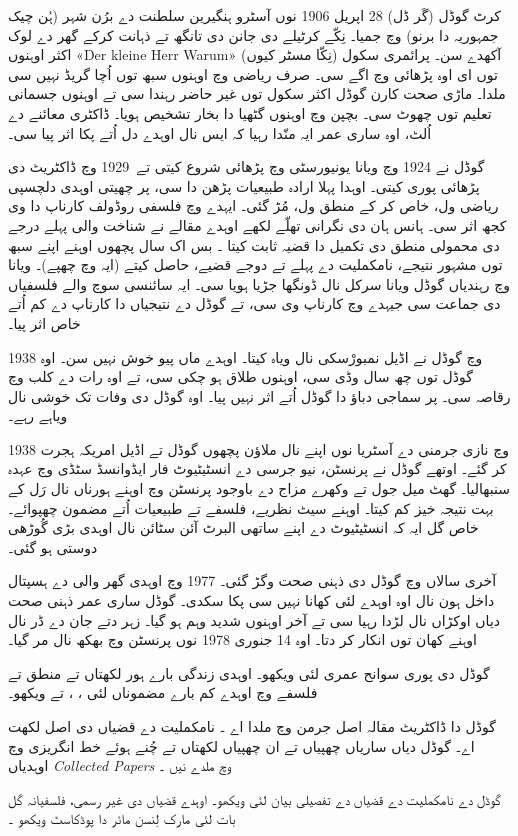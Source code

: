\documentclass[../../../include/open-logic-section]{subfiles}
\begin{document}



کرٹ گوڈل (\textsc{گَر} ڈل) 28 اپریل 1906 نوں آسٹرو ہنگیرین سلطنت دے برُن شہر (ہُن چیک جمہوریہ دا برنو) وچ جمیا۔ نِکّے کرٹیلے دی جانن دی تانگھ تے ذہانت کرکے گھر دے لوک اکثر اوہنوں «Der kleine Herr Warum» (نِکّا مسٹر کیوں) آکھدے سن۔ پرائمری سکول توں ای اوہ پڑھائی وچ اگے سی۔ صرف ریاضی وچ اوہنوں سبھ توں اُچا گریڈ نہیں سی ملدا۔ ماڑی صحت کارن گوڈل اکثر سکول توں غیر حاضر رہندا سی تے اوہنوں جسمانی تعلیم توں چھوٹ سی۔ بچپن وچ اوہنوں گٹھیا دا بخار تشخیص ہویا۔ ڈاکٹری معائنے دے اُلٹ، اوہ ساری عمر ایہ منّدا رہیا کہ ایس نال اوہدے دل اُتے پکا اثر پیا سی۔

گوڈل نے 1924 وچ ویانا یونیورسٹی وچ پڑھائی شروع کیتی تے~1929 وچ ڈاکٹریٹ دی پڑھائی پوری کیتی۔ اوہدا پہلا ارادہ طبیعیات پڑھن دا سی، پر چھیتی اوہدی دلچسپی ریاضی ول، خاص کر کے منطق ول، مُڑ گئی۔ ایہدے وچ فلسفی روڈولف کارناپ دا وی کجھ اثر سی۔ ہانس ہان دی نگرانی تھلّے لکھے اوہدے مقالے نے شناخت والی پہلے درجے دی محمولی منطق دی تکمیل دا قضیہ ثابت کیتا \citep{Godel1929}۔ بس اک سال پچھوں اوہنے اپنے سبھ توں مشہور نتیجے، نامکملیت دے پہلے تے دوجے قضیے، حاصل کیتے (ایہ \citealt{Godel1931} وچ چھپے)۔ ویانا وچ رہندیاں گوڈل ویانا سرکل نال ڈونگھا جڑیا ہویا سی۔ ایہ سائنسی سوچ والے فلسفیاں دی جماعت سی جیہدے وچ کارناپ وی سی، تے گوڈل دے نتیجیاں دا کارناپ دے کم اُتے خاص اثر پیا۔

1938 وچ گوڈل نے اڈیل نمبورْسکی نال ویاہ کیتا۔ اوہدے ماں پیو خوش نہیں سن۔ اوہ گوڈل توں چھ سال وڈی سی، اوہنوں طلاق ہو چکی سی، تے اوہ رات دے کلب وچ رقاصہ سی۔ پر سماجی دباؤ دا گوڈل اُتے اثر نہیں پیا۔ اوہ گوڈل دی وفات تک خوشی نال ویاہے رہے۔

1938 وچ نازی جرمنی دے آسٹریا نوں اپنے نال ملاؤن پچھوں گوڈل تے اڈیل امریکہ ہجرت کر گئے۔ اوتھے گوڈل نے پرنسٹن، نیو جرسی دے انسٹیٹیوٹ فار ایڈوانسڈ سٹڈی وچ عہدہ سنبھالیا۔ گھٹ میل جول تے وکھرے مزاج دے باوجود پرنسٹن وچ اوہنے ہورناں نال رَل کے بہت نتیجہ خیز کم کیتا۔ اوہنے سیٹ نظریے، فلسفے تے طبیعیات اُتے مضمون چھپوائے۔ خاص گل ایہ کہ انسٹیٹیوٹ دے اپنے ساتھی البرٹ آئن سٹائن نال اوہدی بڑی گُوڑھی دوستی ہو گئی۔

آخری سالاں وچ گوڈل دی ذہنی صحت وگڑ گئی۔ 1977 وچ اوہدی گھر والی دے ہسپتال داخل ہون نال اوہ اوہدے لئی کھانا نہیں سی پکا سکدی۔ گوڈل ساری عمر ذہنی صحت دیاں اوکڑاں نال لڑدا رہیا سی تے آخر اوہنوں شدید وہم ہو گیا۔ زہر دتے جان دے ڈر نال اوہنے کھان توں انکار کر دتا۔ اوہ 14 جنوری 1978 نوں پرنسٹن وچ بھکھ نال مر گیا۔

\begin{reading}
گوڈل دی پوری سوانح عمری لئی \citet{Dawson1997} ویکھو۔ اوہدی زندگی بارے ہور لکھتاں تے منطق تے فلسفے وچ اوہدے کم بارے مضموناں لئی \citet{Wang1990}، \citet{Baaz2011}، \citet{Takeuti2003} تے \citet{Sigmund2007} ویکھو۔

گوڈل دا ڈاکٹریٹ مقالہ اصل جرمن وچ ملدا اے \citep{Godel1929}۔ نامکملیت دے قضیاں دی اصل لکھت \citep{Godel1931} اے۔ گوڈل دیاں ساریاں چھپیاں تے ان چھپیاں لکھتاں تے چُنے ہوئے خط انگریزی وچ اوہدیاں \emph{Collected Papers} وچ ملدے نیں \citet{Godel1986,Godel1990}۔

گوڈل دے نامکملیت دے قضیاں دے تفصیلی بیان لئی \citet{Smith2013} ویکھو۔ اوہدے قضیاں دی غیر رسمی، فلسفیانہ گل بات لئی مارک لِنسن مائر دا پوڈکاسٹ ویکھو \citep{Linsenmayer2014}۔
\end{reading}
\end{document}
